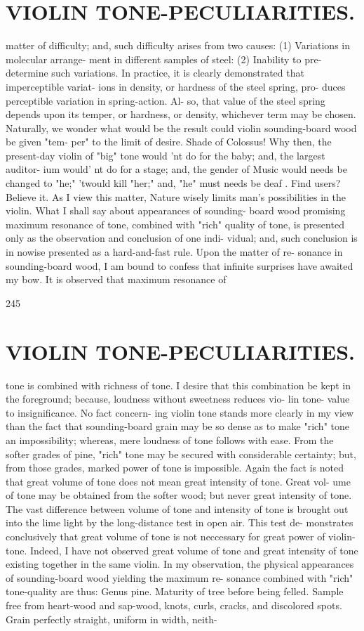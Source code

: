 \documentclass{article}
\begin{document}
\section*{VIOLIN TONE-PECULIARITIES.}
matter of difficulty; and, such difficulty arises from two causes: (1) Variations in molecular arrange- ment in different samples of steel: (2) Inability to pre-determine such variations. In practice, it is clearly demonstrated that imperceptible variat- ions in density, or hardness of the steel spring, pro- duces perceptible variation in spring-action. Al- so, that value of the steel spring depends upon its temper, or hardness, or density, whichever term may be chosen. Naturally, we wonder what would be the result could violin sounding-board wood be given "tem- per" to the limit of desire. Shade of Colossus! Why then, the present-day violin of "big" tone would 'nt do for the baby; and, the largest auditor- ium would' nt do for a stage; and, the gender of Music would needs be changed to "he;" 'twould kill "her;" and, "he" must needs be deaf . Find users? Believe it. As I view this matter, Nature wisely limits man's possibilities in the violin. What I shall say about appearances of sounding- board wood promising maximum resonance of tone, combined with "rich" quality of tone, is presented only as the observation and conclusion of one indi- vidual; and, such conclusion is in nowise presented as a hard-and-fast rule. Upon the matter of re- sonance in sounding-board wood, I am bound to confess that infinite surprises have awaited my bow. It is observed that maximum resonance of

245

\section*{VIOLIN TONE-PECULIARITIES.}
tone is combined with richness of tone. I desire that this combination be kept in the foreground; because, loudness without sweetness reduces vio- lin tone- value to insignificance. No fact concern- ing violin tone stands more clearly in my view than the fact that sounding-board grain may be so dense as to make "rich" tone an impossibility; whereas, mere loudness of tone follows with ease. From the softer grades of pine, "rich" tone may be secured with considerable certainty; but, from those grades, marked power of tone is impossible. Again the fact is noted that great volume of tone does not mean great intensity of tone. Great vol- ume of tone may be obtained from the softer wood; but never great intensity of tone. The vast difference between volume of tone and intensity of tone is brought out into the lime light by the long-distance test in open air. This test de- monstrates conclusively that great volume of tone is not neccessary for great power of violin-tone. Indeed, I have not observed great volume of tone and great intensity of tone existing together in the same violin. In my observation, the physical appearances of sounding-board wood yielding the maximum re- sonance combined with "rich" tone-quality are thus: Genus pine. Maturity of tree before being felled. Sample free from heart-wood and sap-wood, knots, curls, cracks, and discolored spots. Grain perfectly straight, uniform in width, neith-
\end{document}
